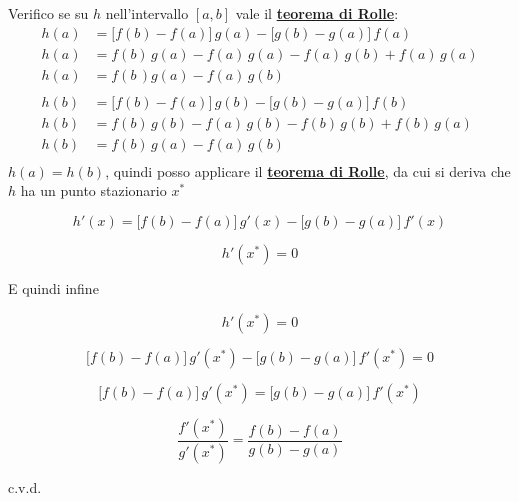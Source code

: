 \documentclass[../dimostrazioni]{subfiles}
\begin{document}
            Verifico se su \(h\) nell'intervallo \([a,b]\) vale il \textbf{\hyperref[teoRolle]{teorema di Rolle}}:
            \begin{align*}
                h(a)&=\big[f(b) - f(a)\big] \, g(a) - \big[g(b) - g(a)\big] \, f(a)\\
                h(a)&=f(b) \, g(a) - f(a) \, g(a) - f(a) \, g(b) + f(a) \, g(a)\\
                h(a)&=f(b \, )g(a) - f(a) \, g(b)\\
                \\
                h(b)&=\big[f(b) - f(a)\big] \, g(b) - \big[g(b) - g(a)\big] \, f(b)\\
                h(b)&=f(b) \, g(b) - f(a) \, g(b) - f(b) \, g(b) + f(b) \, g(a)\\
                h(b)&=f(b) \, g(a) - f(a) \, g(b)\\
            \end{align*}
            \(h(a)=h(b)\), quindi posso applicare il \textbf{\hyperref[teoRolle]{teorema di Rolle}}, da cui si deriva che \(h\) ha un punto stazionario \(x^*\)

            \[    h'(x) = \big[f(b) - f(a)\big] \, g'(x) - \big[g(b) - g(a)\big] \, f'(x) \]
            
            \[    h'(x^*) = 0 \]

            E quindi infine

            \[  h'(x^*) = 0 \]
            
            \[  \big[f(b) - f(a)\big] \, g'(x^*) - \big[g(b) - g(a)\big] \, f'(x^*) = 0 \]

            \[  \big[f(b) - f(a)\big] \, g'(x^*) = \big[g(b) - g(a)\big] \, f'(x^*) \]
            
            \[  \frac{ f'(x^*) }{ g'(x^*) } = \frac{ f(b) - f(a) }{ g(b) - g(a) } \]
            
            c.v.d.
\end{document}
